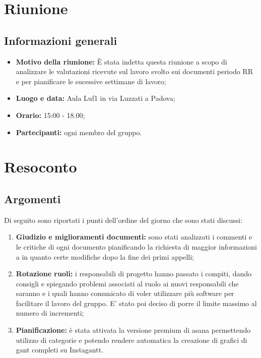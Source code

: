 \documentclass[VER-2018-01-29.tex]{subfiles}
\begin{document}
\chapter{Riunione}

\section{Informazioni generali}	
\begin{itemize}
	\item \textbf{Motivo della riunione:} \`{E} stata indetta questa riunione a scopo di analizzare le valutazioni ricevute sul lavoro svolto sui documenti periodo RR e per pianificare le sucessive settimane di lavoro;
	\item \textbf{Luogo e data:} Aula Luf1 in via Luzzati a Padova;
	\item \textbf{Orario:} 15:00 - 18.00;
	\item \textbf{Partecipanti:} ogni membro del gruppo.
\end{itemize}

\chapter{Resoconto}

\section{Argomenti}	
Di seguito sono riportati i punti dell'ordine del giorno che sono stati discussi:
\begin{enumerate}
	\item \textbf{Giudizio e miglioramenti documenti:} sono stati analizzati i commenti e le critiche di ogni documento pianificando la richiesta di maggior informazioni a \Vardanega in quanto certe modifiche dopo la fine dei primi appelli;
	
	\item \textbf{Rotazione ruoli:} i responsabili di progetto hanno passato i compiti, dando consigli e spiegando problemi associati al ruolo ai nuovi responsabili che saranno \Davide{} e \Riccardo{} i quali hanno comunicato di voler utilizzare più software per facilitare il lavoro del gruppo.
	E' stato poi deciso di porre il limite massimo al numero di incrementi;
	
	\item \textbf{Pianificazione:} è stata attivata la versione premium di asana permettendo utilizzo di categorie e potendo rendere automatica la creazione di grafici di gant completi su Instagantt. 
	
	 
\end{enumerate} 
\end{document}
